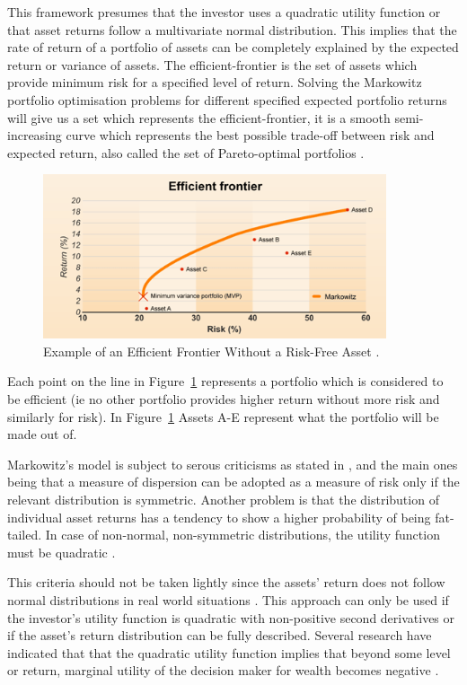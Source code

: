 \documentclass{pdfmx4020}
\begin{document}
    This framework presumes that the investor uses a quadratic utility function or that asset returns follow a multivariate normal distribution. This implies that the rate of return of a portfolio of assets can be completely explained by the expected return or variance of assets. The efficient-frontier is the set of assets which provide minimum risk for a specified level of return. Solving the Markowitz portfolio optimisation problems for different specified expected portfolio returns will give us a set which represents the efficient-frontier, it is a smooth semi-increasing curve which represents the best possible trade-off between risk and expected return, also called the set of Pareto-optimal portfolios \cite{pareto}. 

    \begin{figure}[H]
      \centering
        \includegraphics[width=0.9\textwidth]{efficient_frontier}
      \caption{Example of an Efficient Frontier Without a Risk-Free Asset \cite{efficient_frontier}.}
      \label{efficient_frontier}
    \end{figure}

    Each point on the line in Figure~\ref{efficient_frontier} represents a portfolio which is considered to be efficient (ie no other portfolio provides higher return without more risk and similarly for risk). In Figure~\ref{efficient_frontier} Assets A-E represent what the portfolio will be made out of. 

    Markowitz's model is subject to serous criticisms as stated in \cite{crit}, and the main ones being that a measure of dispersion can be adopted as a measure of risk only if the relevant distribution is symmetric. Another problem is that the distribution of individual asset returns has a tendency to show a higher probability of being fat-tailed. In case of non-normal, non-symmetric distributions, the utility function must be quadratic \cite{crit}. 

    This criteria should not be taken lightly since the assets' return does not follow normal distributions in real world situations \cite{non-dist}. This approach can only be used if the investor's utility function is quadratic with non-positive second derivatives or if the asset's return distribution can be fully described. Several research have indicated that that the quadratic utility function implies that beyond some level or return, marginal utility of the decision maker for wealth becomes negative \cite{crit2,crit3}. 
\end{document}
